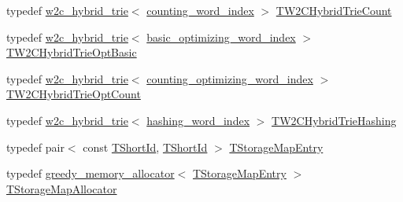 \begin{DoxyCompactItemize}
\item 
typedef \hyperlink{classuva_1_1smt_1_1bpbd_1_1server_1_1lm_1_1w2c__hybrid__trie}{w2c\+\_\+hybrid\+\_\+trie}$<$ \hyperlink{classuva_1_1smt_1_1bpbd_1_1server_1_1lm_1_1dictionary_1_1counting__word__index}{counting\+\_\+word\+\_\+index} $>$ \hyperlink{namespaceuva_1_1smt_1_1bpbd_1_1server_1_1lm_a2f687eb6b62b4c7ea6d69be0a95a6561}{T\+W2\+C\+Hybrid\+Trie\+Count}
\item 
typedef \hyperlink{classuva_1_1smt_1_1bpbd_1_1server_1_1lm_1_1w2c__hybrid__trie}{w2c\+\_\+hybrid\+\_\+trie}$<$ \hyperlink{namespaceuva_1_1smt_1_1bpbd_1_1server_1_1lm_1_1dictionary_a3001583c904eec702b4a4125082a7ecd}{basic\+\_\+optimizing\+\_\+word\+\_\+index} $>$ \hyperlink{namespaceuva_1_1smt_1_1bpbd_1_1server_1_1lm_a55726e9df70d86aab4e861741d877b9c}{T\+W2\+C\+Hybrid\+Trie\+Opt\+Basic}
\item 
typedef \hyperlink{classuva_1_1smt_1_1bpbd_1_1server_1_1lm_1_1w2c__hybrid__trie}{w2c\+\_\+hybrid\+\_\+trie}$<$ \hyperlink{namespaceuva_1_1smt_1_1bpbd_1_1server_1_1lm_1_1dictionary_a61cbd647b15de785ccf4cdd26661c366}{counting\+\_\+optimizing\+\_\+word\+\_\+index} $>$ \hyperlink{namespaceuva_1_1smt_1_1bpbd_1_1server_1_1lm_a6030eefef076c7deda2b71efbbf8ad4b}{T\+W2\+C\+Hybrid\+Trie\+Opt\+Count}
\item 
typedef \hyperlink{classuva_1_1smt_1_1bpbd_1_1server_1_1lm_1_1w2c__hybrid__trie}{w2c\+\_\+hybrid\+\_\+trie}$<$ \hyperlink{classuva_1_1smt_1_1bpbd_1_1server_1_1lm_1_1dictionary_1_1hashing__word__index}{hashing\+\_\+word\+\_\+index} $>$ \hyperlink{namespaceuva_1_1smt_1_1bpbd_1_1server_1_1lm_a298736611f5173aad25522b255002d1f}{T\+W2\+C\+Hybrid\+Trie\+Hashing}
\item 
typedef pair$<$ const \hyperlink{namespaceuva_1_1smt_1_1bpbd_1_1server_1_1lm_1_1identifiers_a33043a191e9a637dea742a89d23c8bdc}{T\+Short\+Id}, \hyperlink{namespaceuva_1_1smt_1_1bpbd_1_1server_1_1lm_1_1identifiers_a33043a191e9a637dea742a89d23c8bdc}{T\+Short\+Id} $>$ \hyperlink{namespaceuva_1_1smt_1_1bpbd_1_1server_1_1lm_af9753207e699d2eca15673a50653797e}{T\+Storage\+Map\+Entry}
\item 
typedef \hyperlink{classuva_1_1utils_1_1containers_1_1alloc_1_1greedy__memory__allocator}{greedy\+\_\+memory\+\_\+allocator}$<$ \hyperlink{namespaceuva_1_1smt_1_1bpbd_1_1server_1_1lm_af9753207e699d2eca15673a50653797e}{T\+Storage\+Map\+Entry} $>$ \hyperlink{namespaceuva_1_1smt_1_1bpbd_1_1server_1_1lm_a70b67dc80579cc0df5e9509d40b2563a}{T\+Storage\+Map\+Allocator}
\item 

\end{DoxyCompactItemize}
